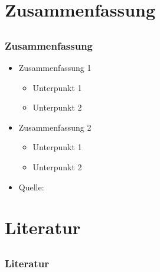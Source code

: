 \documentclass[compress]{beamer}
\begin{document}
\section{Zusammenfassung}
\subsection*{}

\begin{frame}
	\frametitle{Zusammenfassung}

	\begin{itemize}
		\item Zusammenfassung 1
		\begin{itemize}
			\item Unterpunkt 1
			\item Unterpunkt 2
		\end{itemize}
		\item Zusammenfassung 2
		\begin{itemize}
			\item Unterpunkt 1
			\item Unterpunkt 2
		\end{itemize}
		\item Quelle: \cite{Quelle2012}
	\end{itemize}
\end{frame}

\section{Literatur}
\subsection*{}

\begin{frame}
	\frametitle{Literatur}

	
	
\end{frame}
\end{document}
